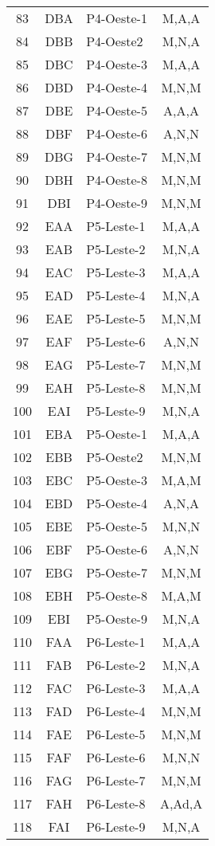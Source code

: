 \documentclass[
	12pt,				%
	openright,			%
	twoside,			%
	a4paper,			%
	english,			%
	french,				%
	spanish,			%
	brazil				%
	]{abntex2}
\begin{document}
\begin{apendicesenv}
\begin{longtable} {| c c l c |}
83 & DBA & P4-Oeste-1 & M,A,A\\
84 & DBB & P4-Oeste2 & M,N,A\\
85 & DBC & P4-Oeste-3 & M,A,A\\
86 & DBD & P4-Oeste-4 & M,N,M\\
87 & DBE & P4-Oeste-5 & A,A,A\\
88 & DBF & P4-Oeste-6 & A,N,N\\
89 & DBG & P4-Oeste-7 & M,N,M\\
90 & DBH & P4-Oeste-8 & M,N,M\\
91 & DBI & P4-Oeste-9 & M,N,M\\


92 & EAA & P5-Leste-1 & M,A,A\\
93 & EAB & P5-Leste-2 & M,N,A\\
94 & EAC & P5-Leste-3 & M,A,A\\
95 & EAD & P5-Leste-4 & M,N,A\\
96 & EAE & P5-Leste-5 & M,N,M\\
97 & EAF & P5-Leste-6 & A,N,N\\
98 & EAG & P5-Leste-7 & M,N,M\\
99 & EAH & P5-Leste-8 & M,N,M\\
100 & EAI & P5-Leste-9 & M,N,A\\


101 & EBA & P5-Oeste-1 & M,A,A\\
102 & EBB & P5-Oeste2 & M,N,M\\
103 & EBC & P5-Oeste-3 & M,A,M\\
104 & EBD & P5-Oeste-4 & A,N,A\\
105 & EBE & P5-Oeste-5 & M,N,N\\
106 & EBF & P5-Oeste-6 & A,N,N\\
107 & EBG & P5-Oeste-7 & M,N,M\\
108 & EBH & P5-Oeste-8 & M,A,M\\
109 & EBI & P5-Oeste-9 & M,N,A\\


110 & FAA & P6-Leste-1 & M,A,A\\
111 & FAB & P6-Leste-2 & M,N,A\\
112 & FAC & P6-Leste-3 & M,A,A\\
113 & FAD & P6-Leste-4 & M,N,M\\
114 & FAE & P6-Leste-5 & M,N,M\\
115 & FAF & P6-Leste-6 & M,N,N\\
116 & FAG & P6-Leste-7 & M,N,M\\
117 & FAH & P6-Leste-8 & A,Ad,A\\
118 & FAI & P6-Leste-9 & M,N,A\\



\end{longtable}
\end{apendicesenv}
\end{document}
